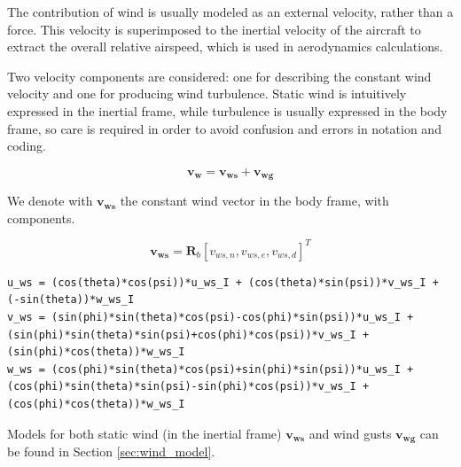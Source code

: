 The contribution of wind is usually modeled as an external velocity, rather than a force. This velocity is superimposed to the inertial velocity of the aircraft to extract the overall relative airspeed, which is used in aerodynamics calculations.

Two velocity components are considered: one for describing the constant wind velocity and one for producing wind turbulence. Static wind is intuitively expressed in the inertial frame, while turbulence is usually expressed in the body frame, so care is required in order to avoid confusion and errors in notation and coding.

\begin{equation}
	\bm{v_w} = \bm{v_{ws}} + \bm{v_{wg}}
\end{equation}

We denote with $\bm{v_{ws}}$ the constant wind vector in the body frame, with components.

\begin{equation}
\bm{v_{ws}} = \bm{R}_b[v_{ws,n}, v_{ws,e}, v_{ws,d}]^T
\end{equation}

\begin{lstlisting}[style=C-style]
u_ws = (cos(theta)*cos(psi))*u_ws_I + (cos(theta)*sin(psi))*v_ws_I + (-sin(theta))*w_ws_I
v_ws = (sin(phi)*sin(theta)*cos(psi)-cos(phi)*sin(psi))*u_ws_I + (sin(phi)*sin(theta)*sin(psi)+cos(phi)*cos(psi))*v_ws_I + (sin(phi)*cos(theta))*w_ws_I
w_ws = (cos(phi)*sin(theta)*cos(psi)+sin(phi)*sin(psi))*u_ws_I + (cos(phi)*sin(theta)*sin(psi)-sin(phi)*cos(psi))*v_ws_I + (cos(phi)*cos(theta))*w_ws_I
\end{lstlisting}

Models for both static wind (in the inertial frame) $\bm{v_{ws}}$ and wind gusts $\bm{v_{wg}}$ can be found in Section \ref{sec:wind_model}.